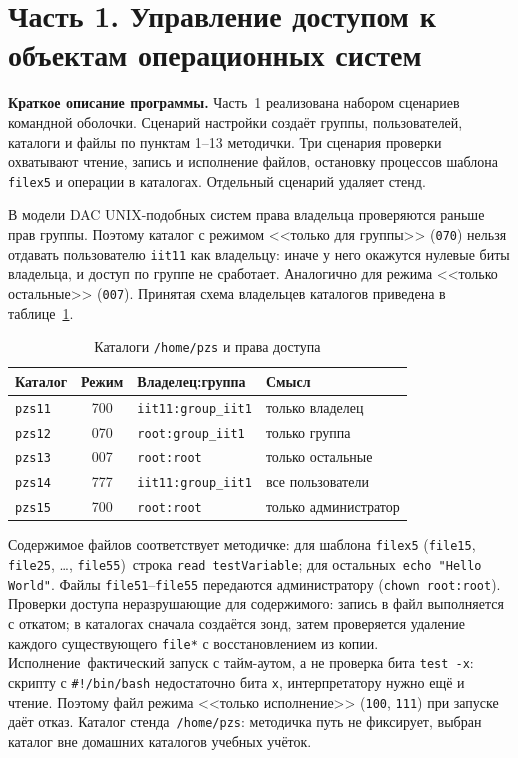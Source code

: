 \section{Часть 1. Управление доступом к объектам операционных систем}
\label{sec:part1}

\textbf{Краткое описание программы.}
Часть~1 реализована набором сценариев командной оболочки. Сценарий настройки создаёт группы, пользователей, каталоги и файлы по пунктам 1--13 методички. Три сценария проверки охватывают чтение, запись и исполнение файлов, остановку процессов шаблона \texttt{filex5} и операции в каталогах. Отдельный сценарий удаляет стенд.

В модели DAC UNIX-подобных систем права владельца проверяются раньше прав группы. Поэтому каталог с режимом <<только для группы>> (\texttt{070}) нельзя отдавать пользователю \texttt{iit11} как владельцу: иначе у него окажутся нулевые биты владельца, и доступ по группе не сработает. Аналогично для режима <<только остальные>> (\texttt{007}). Принятая схема владельцев каталогов приведена в таблице~\ref{tab:p1-dirs}.

\begin{table}[ht]
	\begin{tabularx}{\textwidth}{|l|c|l|X|}
		\hline
		\textbf{Каталог} & \textbf{Режим} & \textbf{Владелец:группа} & \textbf{Смысл} \\
		\hline
		\texttt{pzs11} & 700 & \texttt{iit11:group\_iit1} & только владелец \\
		\hline
		\texttt{pzs12} & 070 & \texttt{root:group\_iit1} & только группа \\
		\hline
		\texttt{pzs13} & 007 & \texttt{root:root} & только остальные \\
		\hline
		\texttt{pzs14} & 777 & \texttt{iit11:group\_iit1} & все пользователи \\
		\hline
		\texttt{pzs15} & 700 & \texttt{root:root} & только администратор \\
		\hline
	\end{tabularx}
	\caption{Каталоги \texttt{/home/pzs} и права доступа}
	\label{tab:p1-dirs}
\end{table}

Содержимое файлов соответствует методичке: для шаблона \texttt{filex5} (\texttt{file15}, \texttt{file25}, \ldots, \texttt{file55})~\mdash  строка \texttt{read testVariable}; для остальных~\mdash  \texttt{echo "Hello World"}. Файлы \texttt{file51}--\texttt{file55} передаются администратору (\texttt{chown root:root}). Проверки доступа неразрушающие для содержимого: запись в файл выполняется с откатом; в каталогах сначала создаётся зонд, затем проверяется удаление каждого существующего \texttt{file*} с восстановлением из копии. Исполнение~\mdash  фактический запуск с тайм-аутом, а не проверка бита \texttt{test -x}: скрипту с \texttt{\#!/bin/bash} недостаточно бита \texttt{x}, интерпретатору нужно ещё и чтение. Поэтому файл режима <<только исполнение>> (\texttt{100}, \texttt{111}) при запуске даёт отказ. Каталог стенда~\mdash  \texttt{/home/pzs}: методичка путь не фиксирует, выбран каталог вне домашних каталогов учебных учёток.

